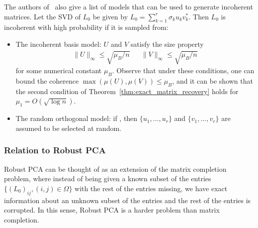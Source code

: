 The authors of~\cite{Candes:2009uq} also give a list of models that can be used to generate incoherent matrices. Let the SVD of $L_0$ be given by $L_0 = \sum_{k=1}^r \sigma_k u_k v_k^*$. Then $L_0$ is incoherent with high probability if it is sampled from:
\begin{itemize}
\item The incoherent basis model: $U$ and $V$ satisfy the size property
\[
\begin{aligned}
\|U\|_\infty \leq \sqrt{\mu_B/n} && \|V\|_\infty \leq \sqrt{\mu_B/n}
\end{aligned}
\]
for some numerical constant $\mu_B$. Observe that under these conditions, one can bound the coherence $\max (\mu(U), \mu(V)) \leq \mu_B$, and it can be shown that the second condition of Theorem~\ref{thm:exact_matrix_recovery} holds for $\mu_1 = O(\sqrt{\log n})$.

\item The random orthogonal model: if , then $\{u_1, \dots, u_r\}$ and $\{v_1, \dots, v_r\}$ are assumed to be selected at random.
\end{itemize}



\subsubsection{Relation to Robust PCA}
%
Robust PCA can be thought of as an extension of the matrix completion problem, where instead of being given a known subset of the entries $\{(L_0)_{ij}, (i,j)\in \Omega\}$ with the rest of the entries missing, we have exact information about an unknown subset of the entries and the rest of the entries is corrupted. In this sense, Robust PCA is a harder problem than matrix completion.

